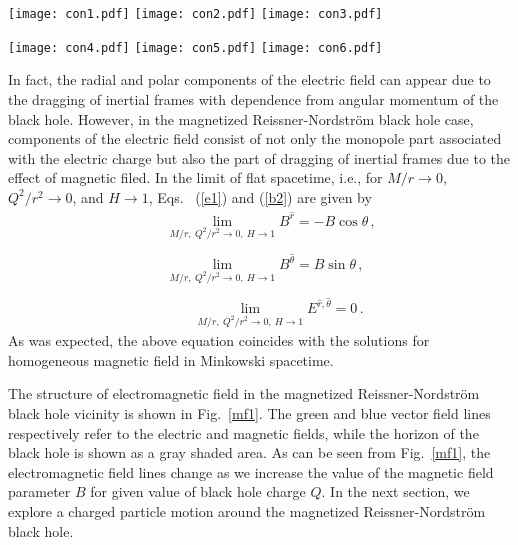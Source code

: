 \documentclass[showpacs,twocolumn,superscriptaddress]{revtex4}
\begin{document}
%
\begin{figure*}
 \texttt{[image: con1.pdf]}
 \texttt{[image: con2.pdf]}
 \texttt{[image: con3.pdf]} 

 \texttt{[image: con4.pdf]}
 \texttt{[image: con5.pdf]}
 \texttt{[image: con6.pdf]} %
\caption{\label{mf1} The configuration of electromagnetic field in the vicinity of a magnetized Reissner-Nordstr\"{o}m black hole. Blue and green lines describe the magnetic and electric fields, respectively. Meanwhile, the horizon is shown as a gray-shaded area. For the figure: first, second, and third columns respectively refer to $B=0.01$, $B=0.05$, and $B=0.1$ in the case of fixed $Q=0.1$ (top panel) and $Q=0.5$ (bottom panel).}
\end{figure*}
%
%
In fact, the radial and polar components of the electric field can
appear due to the dragging of inertial frames with dependence from
angular momentum of the black hole. However, in the magnetized
Reissner-Nordstr\"{o}m black hole case, components of the electric field
consist of not only the monopole part associated with the electric charge but also the part of dragging
of inertial frames due to the effect of magnetic filed. In the
limit of flat spacetime, i.e., for \hbox{$M/r\rightarrow 0$,
$Q^2/r^2\rightarrow 0$}, and \hbox{$H\rightarrow 1$}, Eqs.~
(\ref{e1}) and (\ref{b2}) are given by
%
\begin{eqnarray}
\label{limit_b} && \lim_{M/r,~ Q^2/r^2\rightarrow 0,~ H\rightarrow
1} B^{\hat r} =-B\cos\theta \,, \nonumber
\\ \nonumber \\
 && \lim_{M/r,~ Q^2/r^2\rightarrow 0,~
H\rightarrow 1} B^{\hat\theta}=B\sin\theta   \,, \nonumber
\\ \nonumber \\
\label{limit_e} &&  \qquad \lim_{M/r, ~Q^2/r^2\rightarrow 0, ~
H\rightarrow 1} E^{\hat r,\hat \theta}=0\, .
\end{eqnarray}
%
As was expected, the above equation coincides with the
solutions for homogeneous magnetic field in Minkowski
spacetime.

The structure of electromagnetic field in the 
magnetized Reissner-Nordstr\"{o}m black hole vicinity is shown in
Fig.~\ref{mf1}. The green and blue vector
field lines respectively refer to the electric and magnetic fields, while the horizon of the black hole is shown as
a gray shaded area. As can be seen from Fig.~\ref{mf1}, the
electromagnetic field lines change as we increase the value of the magnetic field parameter $B$ for given value of black hole charge $Q$. In the next section, we explore a charged particle motion around
the magnetized Reissner-Nordstr\"{o}m black hole.
\end{document}
